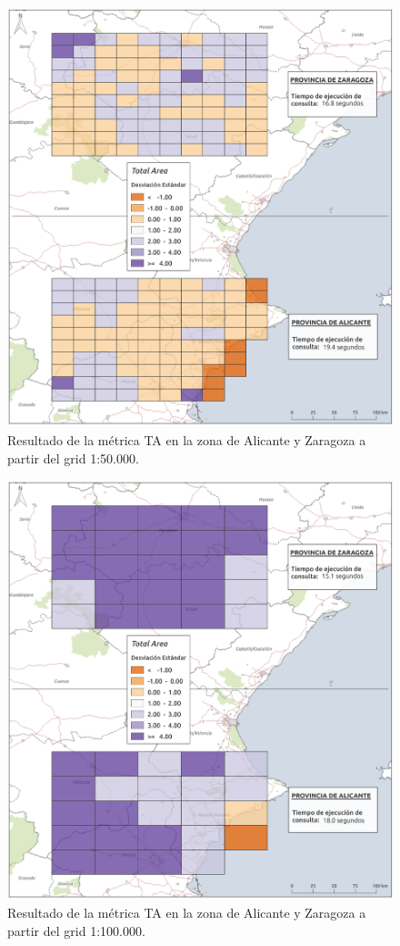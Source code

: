 \begin{figure}
\begin{center}
\includegraphics[width=\textwidth]{ResultadosyDiscusion/Figs/Results/l_50.png}
\caption{Resultado de la métrica TA en la zona de Alicante y Zaragoza a partir del grid 1:50.000.}
\end{center}
\end{figure}

\begin{figure}
\begin{center}
\includegraphics[width=\textwidth]{ResultadosyDiscusion/Figs/Results/l_100.png}
\caption{Resultado de la métrica TA en la zona de Alicante y Zaragoza a partir del grid 1:100.000.}
\end{center}
\end{figure}